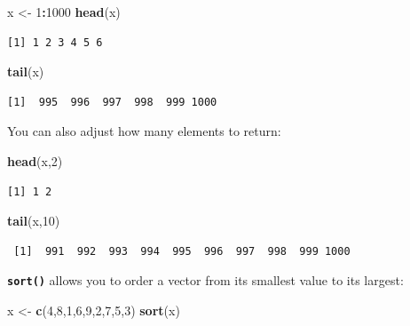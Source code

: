 \documentclass[
]{book}
\newenvironment{Shaded}{\begin{snugshade}}{\end{snugshade}}
\newcommand{\DecValTok}[1]{\textcolor[rgb]{0.00,0.00,0.81}{#1}}
\newcommand{\KeywordTok}[1]{\textcolor[rgb]{0.13,0.29,0.53}{\textbf{#1}}}
\newcommand{\NormalTok}[1]{#1}
\newcommand{\OperatorTok}[1]{\textcolor[rgb]{0.81,0.36,0.00}{\textbf{#1}}}
\newcommand{\StringTok}[1]{\textcolor[rgb]{0.31,0.60,0.02}{#1}}
\begin{document}
\begin{Shaded}
\begin{Highlighting}[]
\NormalTok{x <-}\StringTok{ }\DecValTok{1}\OperatorTok{:}\DecValTok{1000}
\KeywordTok{head}\NormalTok{(x)}
\end{Highlighting}
\end{Shaded}

\begin{verbatim}
[1] 1 2 3 4 5 6
\end{verbatim}

\begin{Shaded}
\begin{Highlighting}[]
\KeywordTok{tail}\NormalTok{(x)}
\end{Highlighting}
\end{Shaded}

\begin{verbatim}
[1]  995  996  997  998  999 1000
\end{verbatim}

You can also adjust how many elements to return:

\begin{Shaded}
\begin{Highlighting}[]
\KeywordTok{head}\NormalTok{(x,}\DecValTok{2}\NormalTok{)}
\end{Highlighting}
\end{Shaded}

\begin{verbatim}
[1] 1 2
\end{verbatim}

\begin{Shaded}
\begin{Highlighting}[]
\KeywordTok{tail}\NormalTok{(x,}\DecValTok{10}\NormalTok{)}
\end{Highlighting}
\end{Shaded}

\begin{verbatim}
 [1]  991  992  993  994  995  996  997  998  999 1000
\end{verbatim}

\textbf{\texttt{sort()}} allows you to order a vector from its smallest value to its largest:

\begin{Shaded}
\begin{Highlighting}[]
\NormalTok{x <-}\StringTok{ }\KeywordTok{c}\NormalTok{(}\DecValTok{4}\NormalTok{,}\DecValTok{8}\NormalTok{,}\DecValTok{1}\NormalTok{,}\DecValTok{6}\NormalTok{,}\DecValTok{9}\NormalTok{,}\DecValTok{2}\NormalTok{,}\DecValTok{7}\NormalTok{,}\DecValTok{5}\NormalTok{,}\DecValTok{3}\NormalTok{)}
\KeywordTok{sort}\NormalTok{(x)}
\end{Highlighting}
\end{Shaded}
\end{document}
